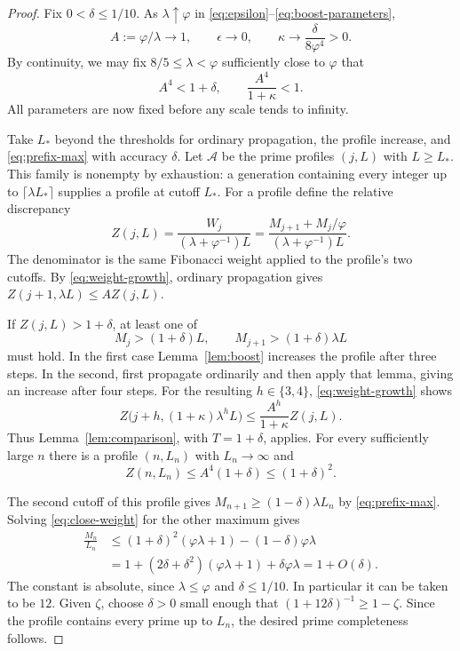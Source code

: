 \documentclass[11pt,letterpaper]{article}
\numberwithin{equation}{section}
\theoremstyle{definition}
\theoremstyle{remark}
\newcommand{\ph}{\varphi}
\newcommand{\ceil}[1]{\lceil #1\rceil}
\begin{document}
\begin{proof}
Fix $0<\delta\le1/10$. As $\lambda\uparrow\ph$ in
\eqref{eq:epsilon}--\eqref{eq:boost-parameters},
\[
 A:=\ph/\lambda\longrightarrow1,\qquad
 \epsilon\longrightarrow0,\qquad
 \kappa\longrightarrow\frac{\delta}{8\ph^4}>0.
\]
By continuity, we may fix $8/5\le\lambda<\ph$ sufficiently close to
$\ph$ that
\begin{equation}\label{eq:choose-lambda}
 A^4<1+\delta,\qquad \frac{A^4}{1+\kappa}<1.
\end{equation}
All parameters are now fixed before any scale tends to infinity.

Take $L_*$ beyond the thresholds for ordinary propagation, the profile
increase, and \eqref{eq:prefix-max} with accuracy $\delta$.
Let $\mathcal A$ be the prime profiles $(j,L)$ with $L\ge L_*$.
This family is nonempty by exhaustion: a generation containing every
integer up to $\ceil{\lambda L_*}$ supplies a profile at cutoff $L_*$.
For a profile define the relative discrepancy
\begin{equation}\label{eq:discrepancy}
 Z(j,L)=\frac{W_j}{(\lambda+\ph^{-1})L}
       =\frac{M_{j+1}+M_j/\ph}{(\lambda+\ph^{-1})L}.
\end{equation}
The denominator is the same Fibonacci weight applied to the profile's
two cutoffs. By \eqref{eq:weight-growth}, ordinary propagation gives
$Z(j+1,\lambda L)\le A Z(j,L)$.

If $Z(j,L)>1+\delta$, at least one of
\[
 M_j>(1+\delta)L,\qquad M_{j+1}>(1+\delta)\lambda L
\]
must hold. In the first case Lemma~\ref{lem:boost} increases the profile
after three steps. In the second, first propagate ordinarily and then
apply that lemma, giving an increase after four steps.
For the resulting $h\in\{3,4\}$, \eqref{eq:weight-growth} shows
\[
 Z\bigl(j+h,(1+\kappa)\lambda^hL\bigr)
 \le\frac{A^h}{1+\kappa}Z(j,L).
\]
Thus Lemma~\ref{lem:comparison}, with $T=1+\delta$, applies.
For every sufficiently large $n$ there is a profile $(n,L_n)$ with
$L_n\to\infty$ and
\begin{equation}\label{eq:close-weight}
 Z(n,L_n)\le A^4(1+\delta)\le(1+\delta)^2.
\end{equation}

The second cutoff of this profile gives
$M_{n+1}\ge(1-\delta)\lambda L_n$ by \eqref{eq:prefix-max}.
Solving \eqref{eq:close-weight} for the other maximum gives
\begin{align*}
 \frac{M_n}{L_n}
 &\le(1+\delta)^2(\ph\lambda+1)-(1-\delta)\ph\lambda\\
 &=1+(2\delta+\delta^2)(\ph\lambda+1)+\delta\ph\lambda
 =1+O(\delta).
\end{align*}
The constant is absolute, since $\lambda\le\ph$ and $\delta\le1/10$.
In particular it can be taken to be $12$. Given $\zeta$, choose
$\delta>0$ small enough that $(1+12\delta)^{-1}\ge1-\zeta$.
Since the profile contains every prime up to $L_n$, the desired
prime completeness follows.
\end{proof}
\end{document}
